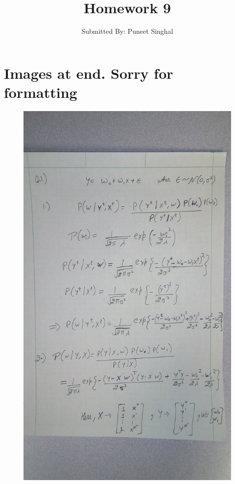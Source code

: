 \documentclass[fleqn]{article}
\title{Homework 9}
\author{Submitted By: Puneet Singhal\\}
\date{}
\begin{document}
	\maketitle
	
	\section{Images at end. Sorry for formatting}
	\begin{adjustwidth}{4em}{0pt}
		\begin{figure}[!ht]
			\centering
			\includegraphics[width=1.4\textwidth, angle=270]{hw9_q1_1.jpg}

\end{figure}
\end{adjustwidth}
\end{document}
